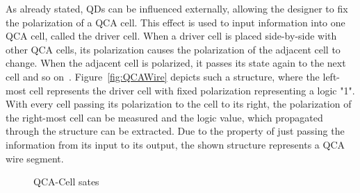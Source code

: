 As already stated, QDs can be influenced externally, allowing the designer to fix the polarization of a QCA cell. This effect is used to input information into one QCA cell, called the driver cell. When a driver cell is placed side-by-side with other QCA cells, its polarization causes the polarization of the adjacent cell to change. When the adjacent cell is polarized, it passes its state again to the next cell and so on~\cite{lent1997device}. Figure~\ref{fig:QCAWire} depicts such a structure, where the left-most cell represents the driver cell with fixed polarization representing a logic "1". With every cell passing its polarization to the cell to its right, the polarization of the right-most cell can be measured and the logic value, which propagated through the structure can be extracted. Due to the property of just passing the information from its input to its output, the shown structure represents a QCA wire segment.

\begin{figure}
	\centering

	\caption{QCA-Cell sates} \label{fig:QCAStates}
\end{figure}

